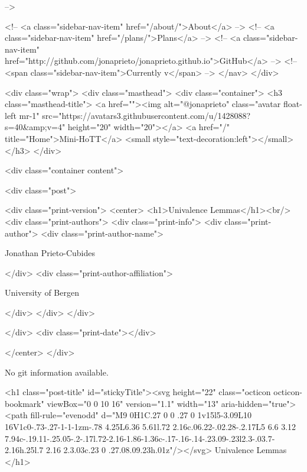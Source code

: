       
     -->

    <!-- <a class="sidebar-nav-item" href="/about/">About</a> -->
    <!-- <a class="sidebar-nav-item" href="/plans/">Plans</a> -->
    <!-- <a class="sidebar-nav-item" href="http://github.com/jonaprieto/jonaprieto.github.io">GitHub</a> -->
    <!-- <span class="sidebar-nav-item">Currently v</span> -->
  </nav>
</div>

    <div class="wrap">
      <div class="masthead">
        <div class="container">
          <h3 class="masthead-title">
            <a href=""><img alt="@jonaprieto" class="avatar float-left mr-1" src="https://avatars3.githubusercontent.com/u/1428088?s=40&amp;v=4" height="20" width="20"></a>
            <a href="/" title="Home">Mini-HoTT</a>
            <small style="text-decoration:left"></small>
          </h3>
        </div>
      
      <div class="container content">
        







<div class="post">

  <div class="print-version">
    <center>
      <h1>Univalence Lemmas</h1><br/>
        <div class="print-authors">
          <div class="print-info">
            <div class="print-author">
              <div class="print-author-name">
                
                  Jonathan Prieto-Cubides
                
              </div>
              <div class="print-author-affiliation">
                
                  University of Bergen
                
                </div>
            </div>
          </div>
          
          
        </div>
        <div class="print-date"></div>
        
        
    </center>
  </div>

  
  No git information available.
  
  <h1 class="post-title" id="stickyTitle"><svg height="22" class="octicon octicon-bookmark" viewBox="0 0 10 16" version="1.1" width="13" aria-hidden="true"><path fill-rule="evenodd" d="M9 0H1C.27 0 0 .27 0 1v15l5-3.09L10 16V1c0-.73-.27-1-1-1zm-.78 4.25L6.36 5.61l.72 2.16c.06.22-.02.28-.2.17L5 6.6 3.12 7.94c-.19.11-.25.05-.2-.17l.72-2.16-1.86-1.36c-.17-.16-.14-.23.09-.23l2.3-.03.7-2.16h.25l.7 2.16 2.3.03c.23 0 .27.08.09.23h.01z"/></svg> Univalence Lemmas
  </h1>

